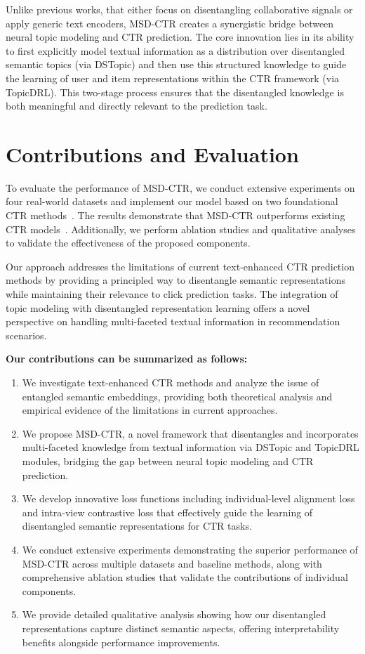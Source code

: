 Unlike previous works\cite{li2023ctrl,kingma2013auto,higgins2017beta}, that either focus on disentangling collaborative signals or apply generic text encoders, MSD-CTR creates a synergistic bridge between neural topic modeling and CTR prediction. The core innovation lies in its ability to first explicitly model textual information as a distribution over disentangled semantic topics (via DSTopic) and then use this structured knowledge to guide the learning of user and item representations within the CTR framework (via TopicDRL). This two-stage process ensures that the disentangled knowledge is both meaningful and directly relevant to the prediction task.

\section{Contributions and Evaluation}

To evaluate the performance of MSD-CTR, we conduct extensive experiments on four real-world datasets and implement our model based on two foundational CTR methods~\cite{guo2017deepfm, wang2021dcn}. The results demonstrate that MSD-CTR outperforms existing CTR models~\cite{zhou2019deep, feng2019deep}. Additionally, we perform ablation studies and qualitative analyses to validate the effectiveness of the proposed components.

Our approach addresses the limitations of current text-enhanced CTR prediction methods by providing a principled way to disentangle semantic representations while maintaining their relevance to click prediction tasks. The integration of topic modeling with disentangled representation learning offers a novel perspective on handling multi-faceted textual information in recommendation scenarios.

\textbf{Our contributions can be summarized as follows:}
\begin{enumerate}
    \item We investigate text-enhanced CTR methods and analyze the issue of entangled semantic embeddings, providing both theoretical analysis and empirical evidence of the limitations in current approaches.
    \item We propose MSD-CTR, a novel framework that disentangles and incorporates multi-faceted knowledge from textual information via DSTopic and TopicDRL modules, bridging the gap between neural topic modeling and CTR prediction.
    \item We develop innovative loss functions including individual-level alignment loss and intra-view contrastive loss that effectively guide the learning of disentangled semantic representations for CTR tasks.
    \item We conduct extensive experiments demonstrating the superior performance of MSD-CTR across multiple datasets and baseline methods, along with comprehensive ablation studies that validate the contributions of individual components.
    \item We provide detailed qualitative analysis showing how our disentangled representations capture distinct semantic aspects, offering interpretability benefits alongside performance improvements.
\end{enumerate}

